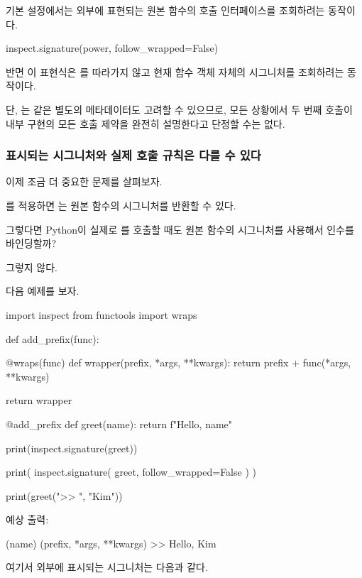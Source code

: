 기본 설정에서는 외부에 표현되는 원본 함수의 호출 인터페이스를 조회하려는 동작이다.

\begin{dhkcode}
inspect.signature(power, follow_wrapped=False)
\end{dhkcode}

반면 이 표현식은 를 따라가지 않고 현재 함수 객체 자체의 시그니처를 조회하려는 동작이다.

단, 는  같은 별도의 메타데이터도 고려할 수 있으므로, 모든 상황에서 두 번째 호출이 내부 구현의 모든 호출 제약을 완전히 설명한다고 단정할 수는 없다.

\subsubsection{표시되는 시그니처와 실제 호출 규칙은 다를 수 있다}

이제 조금 더 중요한 문제를 살펴보자.

를 적용하면 는 원본 함수의 시그니처를 반환할 수 있다.

그렇다면 Python이 실제로 를 호출할 때도 원본 함수의 시그니처를 사용해서 인수를 바인딩할까?

그렇지 않다.

다음 예제를 보자.

\begin{dhkcode}
import inspect
from functools import wraps

def add_prefix(func):

    @wraps(func)
    def wrapper(prefix, *args, **kwargs):
        return prefix + func(*args, **kwargs)

    return wrapper


@add_prefix
def greet(name):
    return f"Hello, {name}"


print(inspect.signature(greet))

print(
    inspect.signature(
        greet,
        follow_wrapped=False
    )
)

print(greet(">> ", "Kim"))
\end{dhkcode}

예상 출력:

\begin{dhkzsh}
(name)
(prefix, *args, **kwargs)
>> Hello, Kim
\end{dhkzsh}

여기서 외부에 표시되는 시그니처는 다음과 같다.

